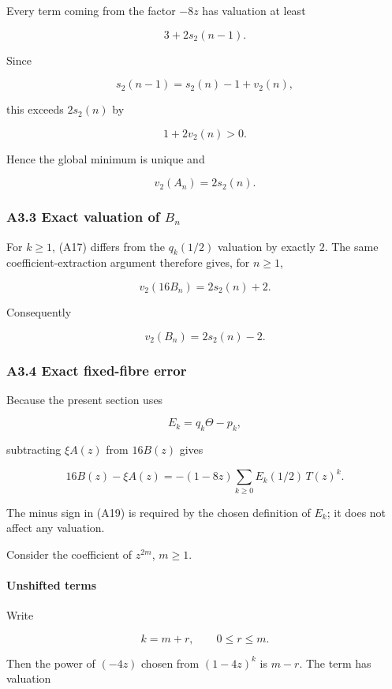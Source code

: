 \documentclass[
  10pt,
  letterpaper,
]{article}
\theoremstyle{definition}
\theoremstyle{remark}
\begin{document}
Every term coming from the factor \(-8z\) has valuation at least

\[
3+2s_2(n-1).
\]

Since

\[
s_2(n-1)=s_2(n)-1+v_2(n),
\]

this exceeds \(2s_2(n)\) by

\[
1+2v_2(n)>0.
\]

Hence the global minimum is unique and

\[
\boxed{v_2(A_n)=2s_2(n).}
\]

\subsubsection{\texorpdfstring{A3.3 Exact valuation of
\(B_n\)}{A3.3 Exact valuation of B\_n}}\label{a3.3-exact-valuation-of-b_n}

For \(k\ge1\), (A17) differs from the \(q_k(1/2)\) valuation by exactly
\(2\). The same coefficient-extraction argument therefore gives, for
\(n\ge1\),

\[
v_2(16B_n)=2s_2(n)+2.
\]

Consequently

\[
\boxed{
v_2(B_n)=2s_2(n)-2.
}
\]

\subsubsection{A3.4 Exact fixed-fibre
error}\label{a3.4-exact-fixed-fibre-error}

Because the present section uses

\[
E_k=q_k\Theta-p_k,
\]

subtracting \(\xi A(z)\) from \(16B(z)\) gives

\[
\boxed{
16B(z)-\xi A(z)
=
-(1-8z)
\sum_{k\ge0}
E_k(1/2)\,
T(z)^k.
}
\tag{A19}
\]

The minus sign in (A19) is required by the chosen definition of \(E_k\);
it does not affect any valuation.

Consider the coefficient of \(z^{2m}\), \(m\ge1\).

\paragraph{Unshifted terms}\label{unshifted-terms}

Write

\[
k=m+r,\qquad 0\le r\le m.
\]

Then the power of \((-4z)\) chosen from \((1-4z)^k\) is \(m-r\). The
term has valuation
\end{document}
